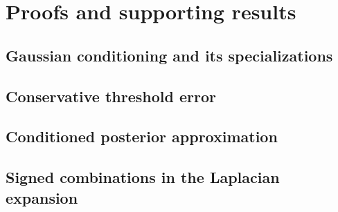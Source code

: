 \section{Proofs and supporting results}\label{app:proofs}
\ifdefined\CombinedInlineProofs\else
\subsection{Gaussian conditioning and its specializations}
\printProofs[finite]
\printProofs[positive]
\printProofs[monotone]
\printProofs[convex]
\printProofs[joint]
\subsection{Conservative threshold error}
\printProofs[error]
\subsection{Conditioned posterior approximation}
\printProofs[approximation]
\fi
\subsection{Signed combinations in the Laplacian expansion}\label{app:joint-combinations}



\FloatBarrier

\FloatBarrier

\FloatBarrier

\FloatBarrier

